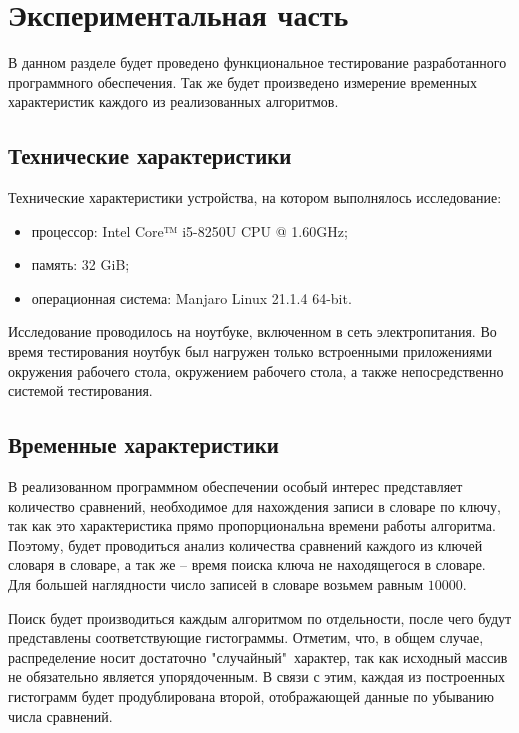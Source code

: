 \chapter{Экспериментальная часть}

В данном разделе будет проведено функциональное тестирование разработанного программного обеспечения. Так же будет произведено измерение временных характеристик каждого из реализованных алгоритмов. 

\section{Технические характеристики}

Технические характеристики устройства, на котором выполнялось исследование:

\begin{itemize}
	\item процессор: Intel Core™ i5-8250U \cite{i5} CPU @ 1.60GHz;
	\item память: 32 GiB;
	\item операционная система: Manjaro \cite{manjaro} Linux \cite{linux} 21.1.4 64-bit.
\end{itemize}

Исследование проводилось на ноутбуке, включенном в сеть электропитания. Во время тестирования ноутбук был нагружен только встроенными приложениями окружения рабочего стола, окружением рабочего стола, а также непосредственно системой тестирования.

\section{Временные характеристики}

В реализованном программном обеспечении особый интерес представляет количество сравнений, необходимое для нахождения записи в словаре по ключу, так как это характеристика прямо пропорциональна времени работы алгоритма. Поэтому, будет проводиться анализ количества сравнений каждого из ключей словаря в словаре, а так же -- время поиска ключа не находящегося в словаре. Для большей наглядности число записей в словаре возьмем равным $10000$. 

Поиск будет производиться каждым алгоритмом по отдельности, после чего будут представлены соответствующие гистограммы. Отметим, что, в общем случае, распределение носит достаточно "случайный"\ характер, так как исходный массив не обязательно является упорядоченным. В связи с этим, каждая из построенных гистограмм будет продублирована второй, отображающей данные по убыванию числа сравнений.

